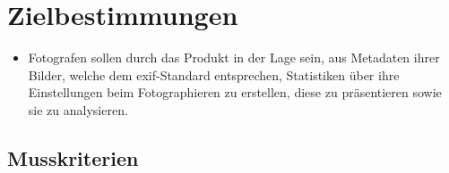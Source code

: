 \section{Zielbestimmungen}

\begin{itemize}
  \item Fotografen sollen durch das Produkt in der Lage sein, aus Metadaten ihrer Bilder, welche dem \gls{exif}-Standard entsprechen, Statistiken über ihre Einstellungen beim Fotographieren zu erstellen, diese zu präsentieren sowie sie zu analysieren.
\end{itemize} 

\subsection{Musskriterien}

\label{subsec:musskriterien}

